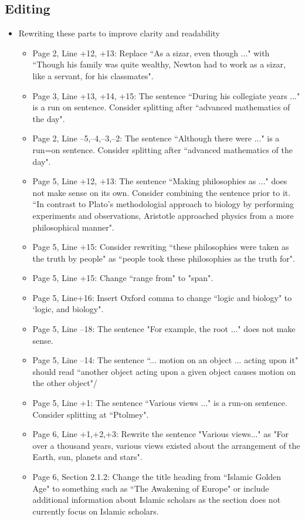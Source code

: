 \documentclass[11pt]{article}
\begin{document}
\subsection*{Editing}

\begin{itemize}
\item Rewriting these parts to improve clarity and readability
	\begin{itemize}
		\item Page 2, Line +12, +13: Replace ``As a sizar, even though ..." with ``Though his family was quite wealthy, Newton had to work as a sizar, like a servant, for his classmates".
		\item Page 3, Line +13, +14, +15: The sentence ``During his collegiate years ..." is a run on sentence. Consider splitting after ``advanced mathematics of the day".
		\item Page 2, Line --5,--4,--3,--2: The sentence ``Although there were ..." is a run=on sentence. Consider splitting after ``advanced mathematics of the day".
		\item Page 5, Line +12, +13: The sentence ``Making philosophies as ..."  does not make sense on its own. Consider combining the sentence prior to it. ``In contrast to Plato's methodologial approach to biology by performing experiments and observations, Aristotle approached physics from a more philosophical manner".
		\item Page 5, Line +15: Consider rewriting ``these philosophies were taken as the truth by people" as ``people took these philosophies as the truth for".
		\item Page 5, Line +15: Change ``range from" to "span".
		\item Page 5, Line+16: Insert Oxford comma to change ``logic and biology" to `logic, and biology".
		\item Page 5, Line --18: The sentence "For example, the root ..." does not make sense.
		\item Page 5, Line --14: The sentence ``... motion on an object ... acting upon it" should read ``another object acting upon a given object causes motion on the other object"/
		\item Page 5, Line +1: The sentence ``Various views ..." is a run-on sentence. Consider splitting at ``Ptolmey".
		\item Page 6, Line +1,+2,+3: Rewrite the sentence "Various views..." as "For over a thousand years, various views existed about the arrangement of the Earth, sun, planets and stars".
		\item Page 6, Section 2.1.2: Change the title heading from ``Islamic Golden Age" to something such as ``The Awakening of Europe" or include additional information about Islamic scholars as the section does not currently focus on Islamic scholars.

\end{itemize}
\end{itemize}
\end{document}
